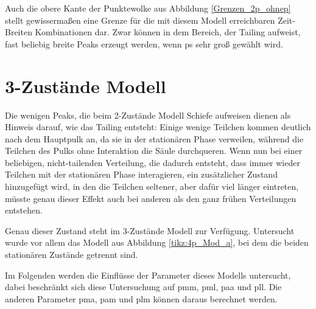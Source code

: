 Auch die obere Kante der Punktewolke aus Abbildung \ref{Grenzen_2p_ohnep} stellt gewissermaßen eine Grenze für die mit diesem Modell erreichbaren Zeit-Breiten Kombinationen dar. Zwar können in dem Bereich, der Tailing aufweist, fast beliebig breite Peaks erzeugt werden, wenn ps sehr groß gewählt wird. 


\section{3-Zustände Modell}
Die wenigen Peaks, die beim 2-Zustände Modell Schiefe aufweisen dienen als Hinweis darauf, wie das Tailing entsteht: Einige wenige Teilchen kommen deutlich nach dem Hauptpulk an, da sie in der stationären Phase verweilen, während die Teilchen des Pulks ohne Interaktion die Säule durchqueren. 
Wenn nun bei einer beliebigen, nicht-tailenden Verteilung, die dadurch entsteht, dass immer wieder Teilchen mit der stationären Phase interagieren, ein zusätzlicher Zustand hinzugefügt wird, in den die Teilchen seltener, aber dafür viel länger eintreten, müsste genau dieser Effekt auch bei anderen als den ganz frühen Verteilungen entstehen.

Genau dieser Zustand steht im 3-Zustände Modell zur Verfügung. Untersucht wurde vor allem das Modell aus Abbildung \ref{tikz:4p_Mod_a}, bei dem die beiden stationären Zustände getrennt sind.

Im Folgenden werden die Einflüsse der Parameter dieses Modells untersucht, dabei beschränkt sich diese Untersuchung auf pmm, pml, paa und pll. Die anderen Parameter pma, pam und plm können daraus berechnet werden.


